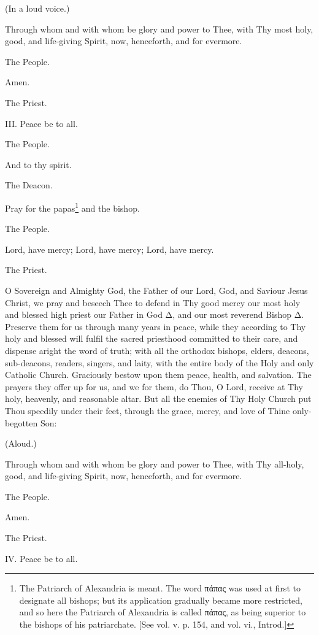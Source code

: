 (In a loud voice.)

Through whom and with whom be glory and power to Thee, with Thy most holy, good, and life-giving Spirit, now, henceforth, and for evermore.

The People.

Amen.

The Priest.

III. Peace be to all.

The People.

And to thy spirit.

The Deacon.

Pray for the papas\footnote{\par  The Patriarch of Alexandria is meant. The word \textgreek{πάπας} was used at first to designate all bishops; but its application gradually became more restricted, and so here the Patriarch of Alexandria is called \textgreek{πάπας}, as being superior to the bishops of his patriarchate. [See vol. v. p. 154, and vol. vi., Introd.]} and the bishop.

The People.

Lord, have mercy; Lord, have mercy; Lord, have mercy.

The Priest.

O Sovereign and Almighty God, the Father of our Lord, God, and Saviour Jesus Christ, we pray and beseech Thee to defend in Thy good mercy our most holy and blessed high priest our Father in God Δ, and our most reverend Bishop Δ. Preserve them for us through many years in peace, while they according to Thy holy and blessed will fulfil the sacred priesthood committed to their care, and dispense aright the word of truth; with all the orthodox bishops, elders, deacons, sub-deacons, readers, singers, and laity, with the entire body of the Holy and only Catholic Church. Graciously bestow upon them peace, health, and salvation. The prayers they offer up for us, and we for them, do Thou, O Lord, receive at Thy holy, heavenly, and reasonable altar. But all the enemies of Thy Holy Church put Thou speedily under their feet, through the grace, mercy, and love of Thine only-begotten Son:

(Aloud.)

Through whom and with whom be glory and power to Thee, with Thy all-holy, good, and life-giving Spirit, now, henceforth, and for evermore.

The People.

Amen.

The Priest.

IV. Peace be to all.

